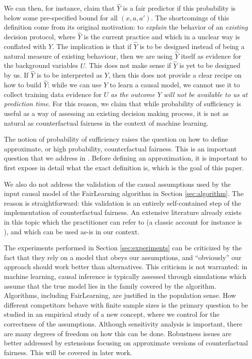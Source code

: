 We can then, for instance, claim that $\hat Y$ is a fair predictor if
this probability is below some pre-specified bound for all $(x, a,
a')$. The shortcomings of this definition come from its original
motivation: to {\it explain} the behavior of an {\it existing}
decision protocol, where $\hat Y$ is the current practice and which in a
unclear way is conflated with $Y$. The implication is that if $\hat Y$
is to be designed instead of being a natural measure of existing
behaviour, then we are using $\hat Y$ itself as evidence for the
background variables $U$. This does not make sense if $\hat Y$ is
yet to be designed by us. If $\hat Y$ is to be interpreted as $Y$, then this
does not provide a clear recipe on how to build $\hat Y$: while we can
use $Y$ to learn a causal model, we cannot use it to collect training
data evidence for $U$ {\it as the outcome $Y$ will not be available to
  us at prediction time}. For this reason, we claim that while
probability of sufficiency is useful as a way of assessing an existing
decision making process, it is not as natural as counterfactual
fairness in the context of machine learning.

 The notion
of probability of sufficiency raises the question on how to define
approximate, or high probability, counterfactual fairness. This is an
important question that we address in \citep{russell:17}. Before
defining an approximation, it is important to first expose in detail
what the exact definition is, which is the goal of this paper.

We also do not address the validation of the causal assumptions used
by the input causal model of the {\sc FairLearning} algorithm in
Section \ref{sec:algorithm}. The reason is straightforward: this
validation is an entirely self-contained step of the implementation of
counterfactual fairness. An extensive literature already exists in
this topic which the practitioner can refer to (a classic account for
instance is \cite{bollen:93}), and which can be used as-is in our
context.

The experiments performed in Section \ref{sec:experiments} can be
criticized by the fact that they rely on a model that obeys our
assumptions, and ``obviously'' our approach should work better than
alternatives. This criticism is not warranted: in machine learning,
causal inference is typically assessed through simulations which
assume that the true model lies in the family covered by the
algorithm.  Algorithms, including {\sc FairLearning}, are justified in
the population sense. How different competitors behave with finite
sample sizes is the primary question to be studied in an empirical
study of a new concept, where we control for the correctness of the
assumptions. Although sensitivity analysis is important, there are
many degrees of freedom on how this can be done. Robustness issues are
better addressed by extensions focusing on approximate versions of 
counterfactual fairness. This will be covered in later work.

